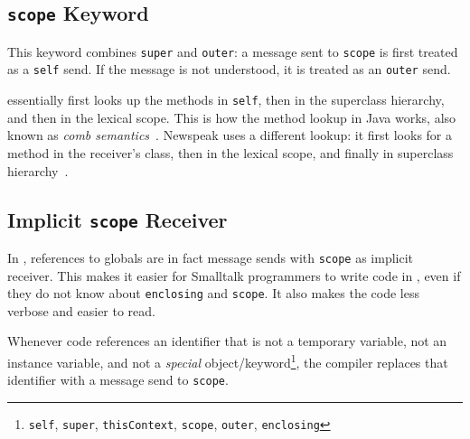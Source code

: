 

\subsection{\texttt{scope} Keyword}
This keyword combines \texttt{super} and \texttt{outer}: a message sent to \texttt{scope} is first treated as a \texttt{self} send. If the message is not understood, it is treated as an \texttt{outer} send.

\msname essentially first looks up the methods in \texttt{self}, then in the superclass hierarchy, and then in the lexical scope. This is how the method lookup in Java works, also known as \emph{comb semantics}~\cite{bracha2007interaction}. Newspeak uses a different lookup: it first looks for a method in the receiver's class, then in the lexical scope, and finally in superclass hierarchy~\cite{bracha:modules_as_objects}.


\subsection{Implicit \texttt{scope} Receiver}
In \msname, references to globals are in fact message sends with \texttt{scope} as implicit receiver. This makes it easier for Smalltalk programmers to write code in \msname, even if they do not know about \texttt{enclosing} and \texttt{scope}. It also makes the code less verbose and easier to read.

Whenever code references an identifier that is not a temporary variable, not an instance variable, and not a \emph{special} object/keyword\footnote{\texttt{self}, \texttt{super}, \texttt{thisContext}, \texttt{scope}, \texttt{outer}, \texttt{enclosing}}, the compiler replaces that identifier with a message send to \texttt{scope}.

